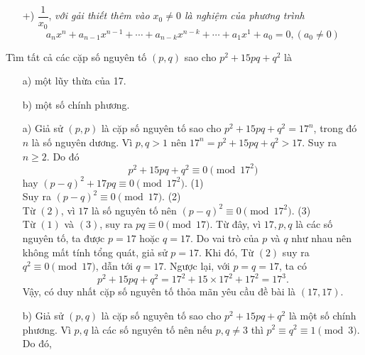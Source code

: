 \begin{bt}
{\begin{nx}
\begin{itemize}
\begin{itemize}
					\[a_0 (x_0-\beta)^n+a_1 (x_0-\beta)^{n-1}+\cdots + a_k (x_0-\beta)^{n-k}+\cdots a_{n-1} + (x_0-\beta)^{1}+a_n=0,(a_0\ne 0)\]
					\item[+)] $\dfrac{1}{x_0}$, \textit{với gải thiết thêm vào $x_0\ne 0$ là nghiệm của phương trình}
					\[a_n x^n+a_{n-1} x^{n-1}+\cdots + a_{n-k} x^{n-k}+\cdots + a_1 x^{1}+a_0=0,(a_0\ne 0)\]
				\end{itemize}
			\end{itemize}
		\end{nx}
	}
\end{bt}


\begin{bt}%
	Tìm tất cả các cặp số nguyên tố $(p,q)$ sao cho $p^2+15pq+q^2$ là
	\begin{itemize}
		\item[a)] một lũy thừa của 17.
		\item[b)] một số chính phương.
	\end{itemize}
	\loigiai
	{\begin{itemize}
			\item[a)] Giả sử $(p,p)$ là cặp số nguyên tố sao cho
			$p^2+15pq+q^2=17^n$, 
			trong đó $n$ là số nguyên dương.
			Vì $p,q>1$ nên $17^n=p^2+15pq+q^2>17$. Suy ra $n\ge 2$. Do đó
			\[p^2+15pq+q^2\equiv 0 \pmod{17^2} \]
			hay $(p-q)^2+17pq \equiv 0 \pmod{17^2}$. \hspace{\fill} (1)\\
			Suy ra $(p-q)^2\equiv 0 \pmod{17} $.\hspace{\fill} (2)\\
			Từ $(2)$, vì $17$ là số nguyên tố nên $(p-q)^2\equiv 0 \pmod{17^2}$. \hspace{\fill} (3)\\
			Từ $(1)$ và $(3)$, suy ra $pq\equiv 0 \pmod{17}$. Từ đây, vì $17,p,q$ là các số nguyên tố, ta được $p=17$ hoặc $q=17$.			
			Do vai trò của $p$ và $q$ như nhau nên không mất tính tổng quát, giả sử $p=17$. Khi đó, Từ $(2)$ suy ra 
			$q^2\equiv 0 \pmod{17}$, 
			dẫn tới $q=17$.
			Ngược lại, với $p=q=17$, ta có
			\[p^2+15pq+q^2=17^2+15\times 17^2+17^2=17^3.\]
			Vậy, có duy nhất cặp số nguyên tố thỏa mãn yêu cầu đề bài là $(17,17)$.
			\item[b)] Giả sử $(p,q)$ là cặp số nguyên tố sao cho 
			$p^2+15pq+q^2$
			là một số chính phương.
			Vì $p,q$ là các số nguyên tố nên nếu $p,q\ne 3$ thì $p^2\equiv q^2 \equiv 1 \pmod{3}$. Do đó,

\end{itemize}}
\end{bt}
